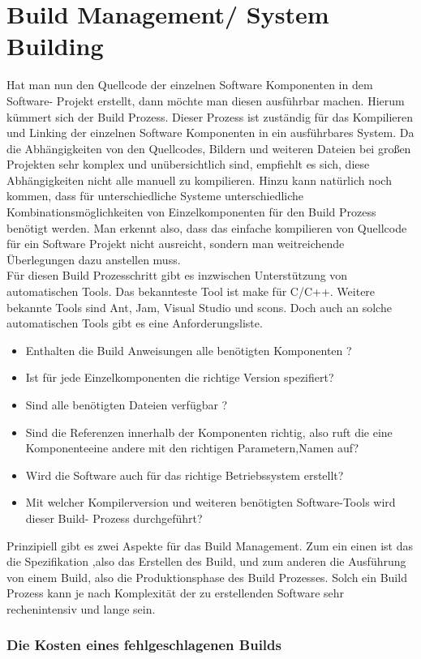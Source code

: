 \chapter{Build Management/ System Building}

Hat man nun den Quellcode der einzelnen Software Komponenten in dem Software- Projekt erstellt, dann möchte man diesen ausführbar machen. Hierum kümmert sich der Build Prozess. Dieser Prozess ist zuständig für das Kompilieren und Linking der einzelnen Software Komponenten in ein ausführbares System. Da die Abhängigkeiten von den Quellcodes, Bildern und weiteren Dateien bei großen Projekten sehr komplex und unübersichtlich sind, empfiehlt es sich, diese Abhängigkeiten nicht alle manuell zu kompilieren. Hinzu kann natürlich noch kommen, dass für unterschiedliche Systeme unterschiedliche Kombinationsmöglichkeiten von Einzelkomponenten für den Build Prozess benötigt werden. Man erkennt also, dass das einfache kompilieren von Quellcode für ein Software Projekt nicht ausreicht, sondern man weitreichende Überlegungen dazu anstellen muss.
\\
Für diesen Build Prozesschritt gibt es inzwischen Unterstützung von automatischen Tools. Das bekannteste Tool ist make für C/C++. Weitere bekannte Tools sind Ant, Jam, Visual Studio und scons.
Doch auch an solche automatischen Tools gibt es eine Anforderungsliste.
\begin{itemize}
\item Enthalten die Build Anweisungen alle benötigten Komponenten ?
\item Ist für jede Einzelkomponenten die richtige Version spezifiert?
\item Sind alle benötigten Dateien verfügbar ?
\item Sind die Referenzen innerhalb der Komponenten richtig, also ruft die eine Komponenteeine andere mit den richtigen Parametern,Namen auf?
\item Wird die Software auch für das richtige Betriebssystem erstellt?
\item Mit welcher Kompilerversion und weiteren benötigten Software-Tools wird dieser Build- Prozess durchgeführt? 	
\end{itemize}

Prinzipiell gibt es zwei Aspekte für das Build Management. Zum ein einen ist das die Spezifikation ,also das Erstellen des Build, und zum anderen die Ausführung von einem Build, also die Produktionsphase des Build Prozesses.
Solch ein Build Prozess kann je nach Komplexität der zu erstellenden Software sehr rechenintensiv und lange sein. 

\subsection{Die Kosten eines fehlgeschlagenen Builds}


